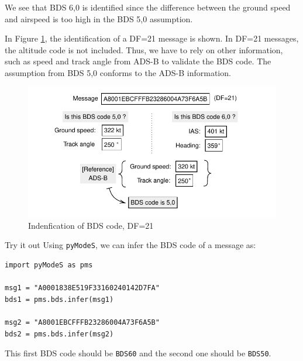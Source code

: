 We see that BDS 6,0 is identified since the difference between the ground speed and airspeed is too high in the BDS 5,0 assumption.

In Figure \ref{fig:bds_bds_infer_example_2}, the identification of a DF=21 message is shown. In DF=21 messages, the altitude code is not included. Thus, we have to rely on other information, such as speed and track angle from ADS-B to validate the BDS code. The assumption from BDS 5,0 conforms to the ADS-B information.

\begin{figure}[ht]
\centering
\includegraphics[scale=0.85]{figures/mode_s/bds_infer_example_2.pdf}
\caption{Indenfication of BDS code, DF=21}
\label{fig:bds_bds_infer_example_2}
\end{figure}

\begin{notebox}{Try it out}
Using \texttt{pyModeS}, we can infer the BDS code of a message as: 

\begin{verbatim}
import pyModeS as pms

msg1 = "A0001838E519F33160240142D7FA"
bds1 = pms.bds.infer(msg1)

msg2 = "A8001EBCFFFB23286004A73F6A5B"
bds2 = pms.bds.infer(msg2)
\end{verbatim}

This first BDS code should be \texttt{BDS60} and the second one should be \texttt{BDS50}.

\end{notebox}
